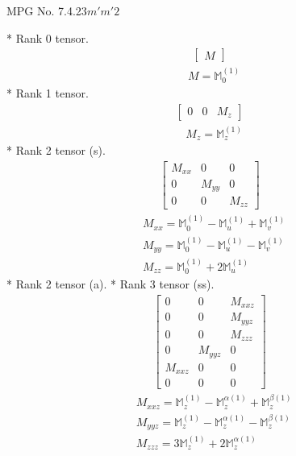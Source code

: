 \documentclass[fleqn,8pt,landscape]{jsarticle}
\begin{document}
\setcounter{MaxMatrixCols}{32}

\renewcommand{\tablename}{Table~}
\renewcommand{\figurename}{Figure~}
\begin{center}
\LARGE
MPG No. 7.4.23\quad$m'm'2$
\end{center}
* Rank 0 tensor.
\begin{align*}
\begin{bmatrix} M \end{bmatrix}
\end{align*}
\begin{align*}
& M = \mathbb{M}_{0}^{(1)}
\end{align*}
* Rank 1 tensor.
\begin{align*}
\begin{bmatrix} 0 & 0 & M_{z} \end{bmatrix}
\end{align*}
\begin{align*}
& M_{z} = \mathbb{M}_{z}^{(1)}
\end{align*}
* Rank 2 tensor (s).
\begin{align*}
\begin{bmatrix} M_{xx} & 0 & 0 \\ 0 & M_{yy} & 0 \\ 0 & 0 & M_{zz} \end{bmatrix}
\end{align*}
\begin{align*}
& M_{xx} = \mathbb{M}_{0}^{(1)} - \mathbb{M}_{u}^{(1)} + \mathbb{M}_{v}^{(1)} \\
& M_{yy} = \mathbb{M}_{0}^{(1)} - \mathbb{M}_{u}^{(1)} - \mathbb{M}_{v}^{(1)} \\
& M_{zz} = \mathbb{M}_{0}^{(1)} + 2 \mathbb{M}_{u}^{(1)}
\end{align*}
* Rank 2 tensor (a).
* Rank 3 tensor (ss).
\begin{align*}
\begin{bmatrix} 0 & 0 & M_{xxz} \\ 0 & 0 & M_{yyz} \\ 0 & 0 & M_{zzz} \\ 0 & M_{yyz} & 0 \\ M_{xxz} & 0 & 0 \\ 0 & 0 & 0 \end{bmatrix}
\end{align*}
\begin{align*}
& M_{xxz} = \mathbb{M}_{z}^{(1)} - \mathbb{M}_{z}^{\alpha(1)} + \mathbb{M}_{z}^{\beta(1)} \\
& M_{yyz} = \mathbb{M}_{z}^{(1)} - \mathbb{M}_{z}^{\alpha(1)} - \mathbb{M}_{z}^{\beta(1)} \\
& M_{zzz} = 3 \mathbb{M}_{z}^{(1)} + 2 \mathbb{M}_{z}^{\alpha(1)}
\end{align*}
\end{document}
